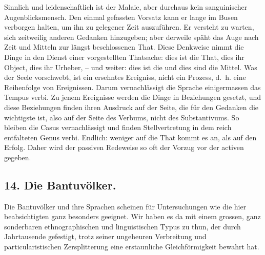 \largerpage[-2]Sinnlich und leidenschaftlich ist der Malaie, aber durchaus kein sanguinischer Augenblicksmensch. Den einmal gefassten Vorsatz kann er lange im Busen verborgen halten, um ihn zu gelegener Zeit auszuführen. Er versteht zu warten, sich zeitweilig anderen Gedanken hinzugeben; aber derweile späht das Auge nach  Zeit und Mitteln zur längst beschlossenen That. Diese Denkweise nimmt die Dinge in den Dienst einer vorgestellten Thatsache: dies ist die That, dies ihr Object, dies ihr Urheber, – und weiter: dies ist die  und dies sind die Mittel. Was der Seele vorschwebt, ist ein ersehntes Ereigniss, nicht ein Prozess, d.~h. eine Reihenfolge von Ereignissen. Darum vernachlässigt die Sprache einigermassen das Tempus verbi. Zu jenem Ereignisse werden die Dinge in  Beziehungen gesetzt, und diese Beziehungen finden ihren \label{sp.420} Ausdruck auf der Seite, die für den Gedanken die wichtigste ist, also auf der Seite des Verbums, nicht des Substantivums. So bleiben die Casus vernachlässigt und finden Stellvertretung in dem reich entfalteten Genus verbi. Endlich: weniger auf die That \label{fp.399} kommt es an, als auf den Erfolg. Daher wird der passiven Redeweise so oft der Vorzug vor der activen gegeben.

\clearpage{}
\subsection*{14. Die Bantuvölker.}\label{IV.IV.14}

\begin{styleAnmerk}
\end{styleAnmerk}
Die Bantuvölker und ihre Sprachen scheinen für Untersuchungen wie die hier beabsichtigten ganz besonders geeignet. Wir haben es da mit einem grossen, ganz sonderbaren ethnographischen und linguistischen Typus zu thun, der durch Jahrtausende gefestigt, trotz seiner ungeheuren Verbreitung und particularistischen Zersplitterung eine erstaunliche Gleichförmigkeit bewahrt hat.

